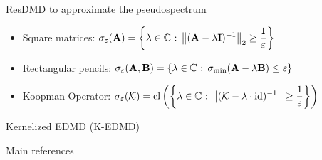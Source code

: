 \documentclass{beamer}
\begin{document}
\begin{frame}{ResDMD to approximate the pseudospectrum}
\begin{definition}[Pseudospectrum]
\begin{itemize}
    \item Square matrices: $\displaystyle{\sigma_{\varepsilon}(\vb{A}) = \left\{ \lambda\in\mathbb{C}\text{ : } \norm{(\vb{A} - \lambda \vb{I})^{-1}}_2 \geq \frac{1}{\varepsilon}\right\}}$
    \item Rectangular pencils: $\displaystyle{\sigma_{\varepsilon}(\vb{A}, \vb{B}) = \left\{ \lambda\in\mathbb{C}\text{ : } \sigma_{\mathrm{min}}(\vb{A} - \lambda \vb{B}) \leq \varepsilon \right\}}$
    \item Koopman Operator: $\displaystyle{\sigma_{\varepsilon}(\mathcal{K}) = \mathrm{cl}\left( \left\{ \lambda\in\mathbb{C}\text{ : } \norm{(\mathcal{K} - \lambda \cdot \mathrm{id})^{-1}} \geq \frac{1}{\varepsilon}\right\} \right)}$
\end{itemize}
\end{definition}
\end{frame}

\begin{frame}{Kernelized EDMD (K-EDMD)}
    
\end{frame}
\begin{frame}{Main references}
\nocite{*}
\printbibliography
\end{frame}
\end{document}
